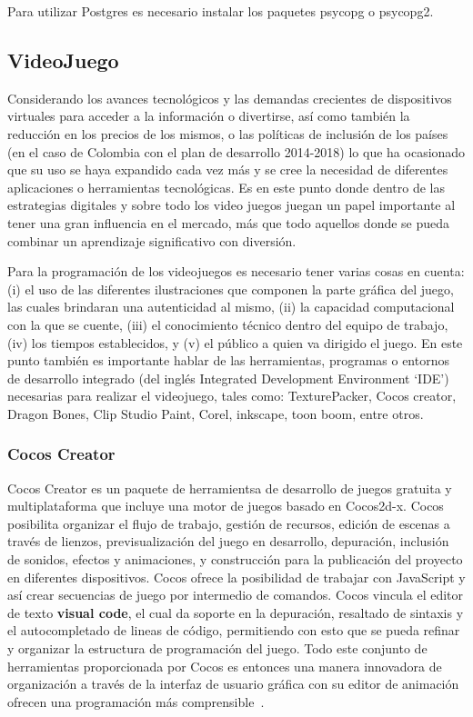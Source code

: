 \documentclass[journal,transmag]{IEEEtran}
\begin{document}
Para utilizar Postgres es necesario instalar los paquetes psycopg o psycopg2.

\subsection{VideoJuego}\label{videojuego}
Considerando los avances tecnológicos y las demandas crecientes de dispositivos virtuales para acceder a la información o divertirse, así como también la reducción en los precios de los mismos, o las políticas de inclusión de los países (en el caso de Colombia con el plan de desarrollo 2014-2018) lo que ha ocasionado que su uso se haya expandido cada vez más y se cree la necesidad de diferentes aplicaciones o herramientas tecnológicas. Es en este punto donde dentro de las estrategias digitales y sobre todo los video juegos juegan un papel importante al tener una gran influencia en el mercado, más que todo aquellos donde se pueda combinar un aprendizaje significativo con diversión.

Para la programación de los videojuegos es necesario tener varias cosas en cuenta: (i) el uso de las diferentes ilustraciones que componen la parte gráfica del juego, las cuales brindaran una autenticidad al mismo, (ii) la capacidad computacional con la que se cuente, (iii) el conocimiento técnico dentro del equipo de trabajo, (iv) los tiempos establecidos, y (v) el público a quien va dirigido el juego. En este punto también es importante hablar de las herramientas, programas o entornos de desarrollo integrado (del inglés Integrated Development Environment `IDE') necesarias para realizar el videojuego, tales como: TexturePacker, Cocos creator, Dragon Bones, Clip Studio Paint, Corel, inkscape, toon boom, entre otros.

\subsubsection{Cocos Creator}
Cocos Creator es un paquete de herramientsa de desarrollo de juegos gratuita y multiplataforma que incluye una motor de juegos basado en Cocos2d-x. Cocos posibilita organizar el flujo de trabajo, gestión de recursos, edición de escenas a través de lienzos, previsualización del juego en desarrollo, depuración, inclusión de sonidos, efectos y animaciones, y construcción para la publicación del proyecto en diferentes dispositivos. Cocos ofrece la posibilidad de trabajar con JavaScript y así crear secuencias de juego por intermedio de comandos. Cocos vincula el editor de texto \textbf{visual code}, el cual da soporte en la depuración, resaltado de sintaxis y el autocompletado de lineas de código, permitiendo con esto que se pueda refinar y organizar la estructura de programación del juego. Todo este conjunto de herramientas proporcionada por Cocos es entonces una manera innovadora de organización a través de la interfaz de usuario gráfica con su editor de animación ofrecen una programación más comprensible~\cite{Cocos}.
\end{document}
